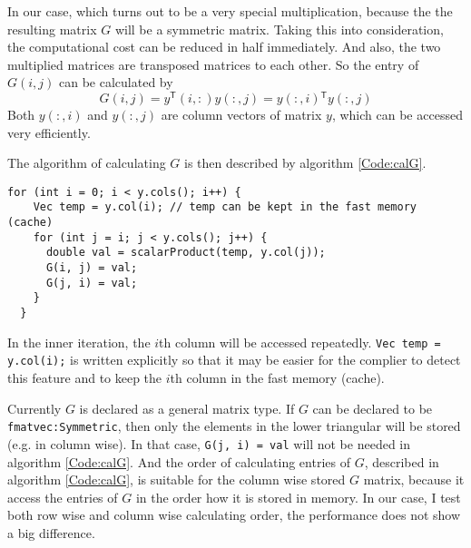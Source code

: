 \documentclass[a4paper,fleqn,13pt]{article}
\newcommand\transpose{{}^\mathsf{T}}
\begin{document}
In our case, which turns out to be a very special multiplication, because the the resulting matrix $G$ will be a symmetric matrix. Taking this into consideration, the computational cost can be reduced in half immediately. And also, the two multiplied matrices are transposed matrices to each other.
So the entry of $G(i,j)$ can be calculated by
\begin{equation}
 G(i,j) = {y}\transpose(i,:) y(:,j) = {y(:,i)}\transpose y(:,j)
\end{equation}
Both $y(:,i)$ and ${y(:,j)}$ are column vectors of matrix $y$, which can be accessed very efficiently. 

The algorithm of calculating $G$ is then described by algorithm \ref{Code:calG}.

  \begin{lstlisting}[float=!h, caption=Algorithm of calculating $G$,label=Code:calG, mathescape=true]
  for (int i = 0; i < y.cols(); i++) {
    Vec temp = y.col(i); // temp can be kept in the fast memory (cache)
    for (int j = i; j < y.cols(); j++) {
      double val = scalarProduct(temp, y.col(j));
      G(i, j) = val;
      G(j, i) = val;
    }
  }
  \end{lstlisting}


In the inner iteration, the $i$th column will be accessed repeatedly.    
\lstinline!Vec temp = y.col(i);! is written explicitly so that it may be easier for the complier to detect this feature and to keep the $i$th column in the fast memory (cache).

Currently $G$ is declared as a general matrix type. 
If $G$ can be declared to be \lstinline!fmatvec:Symmetric!,
then only the elements in the lower triangular will be stored (e.g. in column wise).
In that case, \lstinline!G(j, i) = val! will not be needed in algorithm \ref{Code:calG}.
And the order of calculating entries of $G$, described in algorithm \ref{Code:calG}, is suitable for the column wise stored $G$ matrix, because it access the entries of $G$ in the order how it is stored in memory.   
In our case, I test both row wise and column wise calculating order, the performance does not show a big difference.
\end{document}
